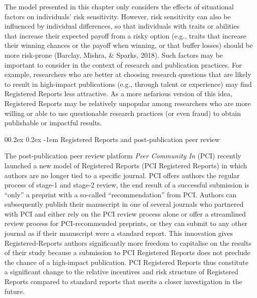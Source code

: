 \documentclass[british,,man,mask,floatsintext]{apa6}
\makeatletter
\renewcommand{\paragraph}{\@startsection{paragraph}{4}{\parindent}%
  {0\baselineskip \@plus 0.2ex \@minus 0.2ex}%
  {-1em}%
  {\normalfont\normalsize\bfseries\itshape\typesectitle}}
\makeatother
\begin{document}
The model presented in this chapter only considers the effects of situational factors on individuals' risk sensitivity.
However, risk sensitivity can also be influenced by individual differences, so that individuals with traits or abilities that increase their expected payoff from a risky option (e.g., traits that increase their winning chances or the payoff when winning, or that buffer losses) should be more risk-prone (Barclay, Mishra, \& Sparks, 2018).
Such factors may be important to consider in the context of research and publication practices.
For example, researchers who are better at choosing research questions that are likely to result in high-impact publications (e.g., through talent or experience) may find Registered Reports less attractive.
As a more nefarious version of this idea, Registered Reports may be relatively unpopular among researchers who are more willing or able to use questionable research practices (or even fraud) to obtain publishable or impactful results.

\hypertarget{registered-reports-and-post-publication-peer-review}{%
\paragraph{Registered Reports and post-publication peer review}\label{registered-reports-and-post-publication-peer-review}}

The post-publication peer review platform \emph{Peer Community In} (PCI) recently launched a new model of Registered Reports (PCI Registered Reports) in which authors are no longer tied to a specific journal.
PCI offers authors the regular process of stage-1 and stage-2 review, the end result of a successful submission is \enquote{only} a preprint with a so-called \enquote{recommendation} from PCI.
Authors can subsequently publish their manuscript in one of several journals who partnered with PCI and either rely on the PCI review process alone or offer a streamlined review process for PCI-recommended preprints, or they can submit to any other journal as if their manuscript were a standard report.
This innovation gives Registered-Reports authors significantly more freedom to capitalise on the results of their study because a submission to PCI Registered Reports does not preclude the chance of a high-impact publication.
PCI Registered Reports thus constitute a significant change to the relative incentives and risk structure of Registered Reports compared to standard reports that merits a closer investigation in the future.
\end{document}
